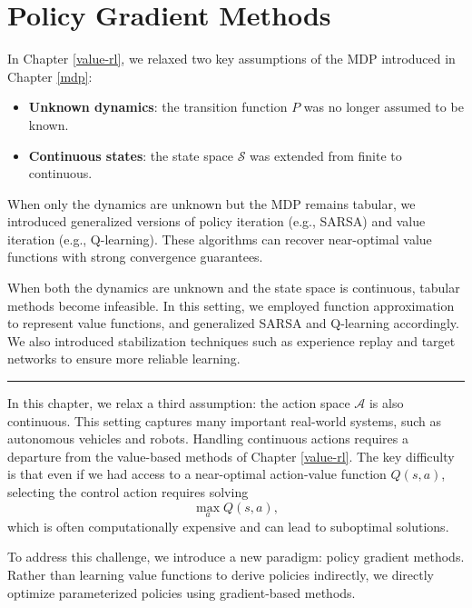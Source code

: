 \documentclass[
]{book}
\providecommand{\tightlist}{%
  \setlength{\itemsep}{0pt}\setlength{\parskip}{0pt}}
\theoremstyle{definition}
\theoremstyle{definition}
\theoremstyle{definition}
\theoremstyle{definition}
\theoremstyle{remark}
\begin{document}
\chapter{Policy Gradient Methods}\label{policy-gradient}

In Chapter \ref{value-rl}, we relaxed two key assumptions of the MDP introduced in Chapter \ref{mdp}:

\begin{itemize}
\tightlist
\item
  \textbf{Unknown dynamics}: the transition function \(P\) was no longer assumed to be known.\\
\item
  \textbf{Continuous states}: the state space \(\mathcal{S}\) was extended from finite to continuous.
\end{itemize}

When only the dynamics are unknown but the MDP remains tabular, we introduced generalized versions of policy iteration (e.g., SARSA) and value iteration (e.g., Q-learning). These algorithms can recover near-optimal value functions with strong convergence guarantees.

When both the dynamics are unknown and the state space is continuous, tabular methods become infeasible. In this setting, we employed function approximation to represent value functions, and generalized SARSA and Q-learning accordingly. We also introduced stabilization techniques such as experience replay and target networks to ensure more reliable learning.

\begin{center}\rule{0.5\linewidth}{0.5pt}\end{center}

In this chapter, we relax a third assumption: the action space \(\mathcal{A}\) is also continuous. This setting captures many important real-world systems, such as autonomous vehicles and robots. Handling continuous actions requires a departure from the value-based methods of Chapter \ref{value-rl}. The key difficulty is that even if we had access to a near-optimal action-value function \(Q(s,a)\), selecting the control action requires solving
\[
\max_a Q(s,a),
\]
which is often computationally expensive and can lead to suboptimal solutions.

To address this challenge, we introduce a new paradigm: policy gradient methods. Rather than learning value functions to derive policies indirectly, we directly optimize parameterized policies using gradient-based methods.
\end{document}
